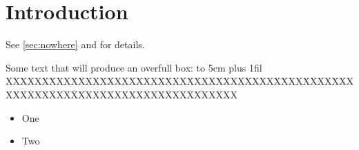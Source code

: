 \documentclass{article}
\begin{document}
\section{Introduction}
See \ref{sec:nowhere} and \cite{knuth1984} for details.

\undefinedcommand

Some text that will produce an overfull box: \hbox to 5cm{\hskip 0pt plus 1fil XXXXXXXXXXXXXXXXXXXXXXXXXXXXXXXXXXXXXXXXXXXXXXXXXXXXXXXXXXXXXXXXXXXXXXXXXXXXXXXX}



\begin{itemize}
\item One
\item Two
\end{itemize}
\end{document}
